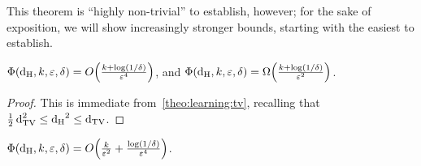 \documentclass[10pt]{article}
\newcommand{\dst}{\varepsilon}
\newcommand{\ab}{k}
\begin{document}
This theorem is ``highly non-trivial'' to establish, however; for the sake of exposition, we will show increasingly stronger bounds, starting with the easiest to establish.
\begin{proposition}\label{theo:learning:hellinger:easy}
  $\Phi(\dhell,\ab,\dst,\delta) = \bigO{\frac{\ab+\log(1/\delta)}{\dst^4}}$, and $\Phi(\dhell,\ab,\dst,\delta) = \bigOmega{\frac{\ab+\log(1/\delta)}{\dst^2}}$.
\end{proposition}
\begin{proof}
    This is immediate from~\autoref{theo:learning:tv}, recalling that $\frac{1}{2}\operatorname{d}_{\rm TV}^2\leq \operatorname{d_{\rm{}H}}^2\leq \operatorname{d}_{\rm TV}$.
\end{proof}
\begin{proposition}\label{theo:learning:hellinger:intermediate}
  $\Phi(\dhell,\ab,\dst,\delta) = \bigO{\frac{\ab}{\dst^2}+\frac{\log(1/\delta)}{\dst^4}}$.
\end{proposition}
\end{document}
